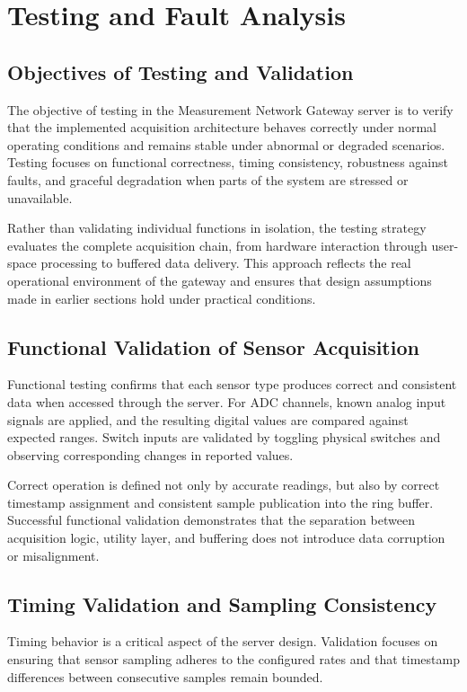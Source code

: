 \section{Testing and Fault Analysis}
\subsection{Objectives of Testing and Validation}
The objective of testing in the Measurement Network Gateway server is to verify that the implemented acquisition architecture behaves correctly under normal operating conditions and remains stable under abnormal or degraded scenarios. Testing focuses on functional correctness, timing consistency, robustness against faults, and graceful degradation when parts of the system are stressed or unavailable.

Rather than validating individual functions in isolation, the testing strategy evaluates the complete acquisition chain, from hardware interaction through user-space processing to buffered data delivery. This approach reflects the real operational environment of the gateway and ensures that design assumptions made in earlier sections hold under practical conditions.


\subsection{Functional Validation of Sensor Acquisition}
Functional testing confirms that each sensor type produces correct and consistent data when accessed through the server. For ADC channels, known analog input signals are applied, and the resulting digital values are compared against expected ranges. Switch inputs are validated by toggling physical switches and observing corresponding changes in reported values.

Correct operation is defined not only by accurate readings, but also by correct timestamp assignment and consistent sample publication into the ring buffer. Successful functional validation demonstrates that the separation between acquisition logic, utility layer, and buffering does not introduce data corruption or misalignment.


\subsection{Timing Validation and Sampling Consistency}
Timing behavior is a critical aspect of the server design. Validation focuses on ensuring that sensor sampling adheres to the configured rates and that timestamp differences between consecutive samples remain bounded.

